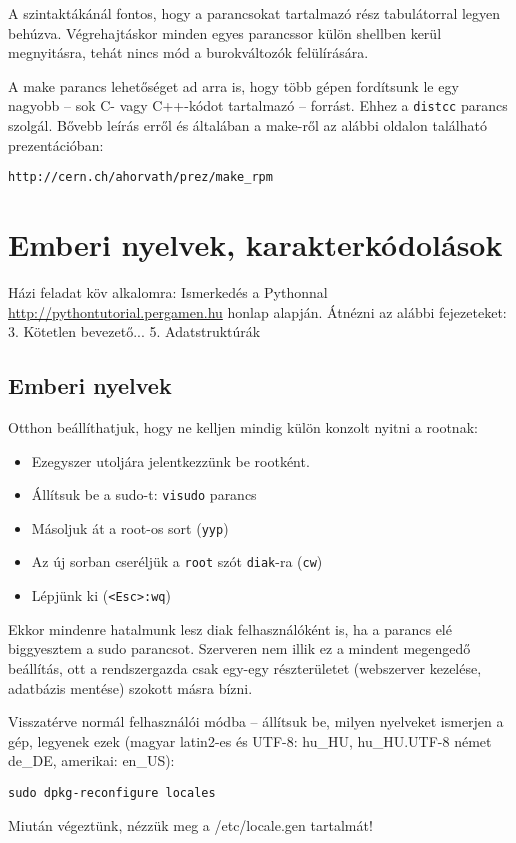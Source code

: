 \documentclass[a4paper]{article}
\newcommand{\code}{\texttt}
\begin{document}
A szintaktákánál fontos, hogy a parancsokat tartalmazó rész tabulátorral
legyen behúzva. Végrehajtáskor minden egyes parancssor külön shellben kerül
megnyitásra, tehát nincs mód a burokváltozók felülírására.

A make parancs lehetőséget ad arra is, hogy több gépen fordítsunk le egy
nagyobb -- sok C- vagy C++-kódot tartalmazó -- forrást. Ehhez a
\texttt{distcc} parancs szolgál.
Bővebb leírás erről és általában a make-ről az alábbi oldalon található
prezentációban:
\begin{Verbatim}
http://cern.ch/ahorvath/prez/make_rpm
\end{Verbatim}

\newpage
\section{Emberi nyelvek, karakterkódolások}

Házi feladat köv alkalomra: Ismerkedés a Pythonnal
\url{http://pythontutorial.pergamen.hu} honlap alapján. Átnézni az alábbi
fejezeteket: 3. Kötetlen bevezető... 5.  Adatstruktúrák

\subsection{Emberi nyelvek}

Otthon beállíthatjuk, hogy ne kelljen mindig külön
konzolt nyitni a rootnak:
\begin{itemize}
\item Ezegyszer utoljára jelentkezzünk be rootként.
\item Állítsuk be a sudo-t: \code{visudo} parancs
\item Másoljuk át a root-os sort (\code{yyp})
\item Az új sorban cseréljük a \code{root} szót \code{diak}-ra (\code{cw})
\item Lépjünk ki (\code{<Esc>:wq})
\end{itemize}
Ekkor mindenre hatalmunk lesz diak felhasználóként is, ha a parancs elé
biggyesztem a sudo parancsot. Szerveren nem illik ez a mindent
megengedő beállítás, ott a rendszergazda csak egy-egy részterületet
(webszerver kezelése, adatbázis mentése) szokott másra bízni.

Visszatérve normál felhasználói módba -- állítsuk be, milyen
nyelveket ismerjen a gép, legyenek ezek (magyar latin2-es és UTF-8:
hu\_HU, hu\_HU.UTF-8 német de\_DE, amerikai: en\_US):
\begin{Verbatim}
sudo dpkg-reconfigure locales
\end{Verbatim}
Miután végeztünk, nézzük meg a /etc/locale.gen tartalmát!
\end{document}
